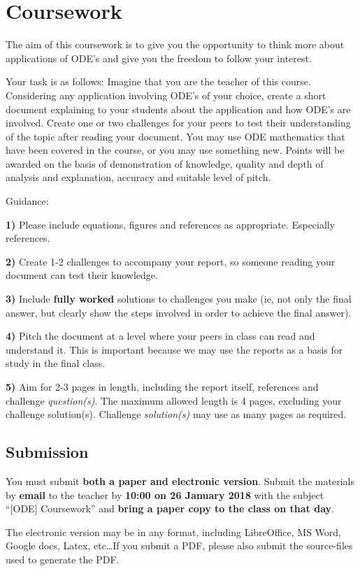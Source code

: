 \newpage
\section{Coursework}
The aim of this coursework is to give you the opportunity to think more about applications of ODE's and give you the freedom to follow your interest.

Your task is as follows:
Imagine that you are the teacher of this course.
Considering any application involving ODE's of your choice, create a short document explaining to your students about the application and how ODE's are involved.
Create one or two challenges for your peers to test their understanding of the topic after reading your document.
You may use ODE mathematics that have been covered in the course, or you may use something new.
Points will be awarded on the basis of demonstration of knowledge, quality and depth of analysis and explanation, accuracy and suitable level of pitch.

Guidance:

\textbf{1)} Please include equations, figures and references as appropriate. Especially references.

\textbf{2)} Create 1-2 challenges to accompany your report, so someone reading your document can test their knowledge.

\textbf{3)} Include \textbf{fully worked} solutions to challenges you make (ie, not only the final answer, but clearly show the steps involved in order to achieve the final answer).

\textbf{4)} Pitch the document at a level where your peers in class can read and understand it. This is important because we may use the reports as a basis for study in the final class.

\textbf{5)} Aim for 2-3 pages in length, including the report itself, references and challenge \emph{question(s)}. The maximum allowed length is 4 pages, excluding your challenge solution(s). Challenge \emph{solution(s)} may use as many pages as required.

\subsection{Submission}
You must submit \textbf{both a paper and electronic version}. Submit the materials by \textbf{email} to the teacher by \textbf{10:00 on 26 January 2018} with the subject ``[ODE] Coursework'' and \textbf{bring a paper copy to the class on that day}.

The electronic version may be in any format, including LibreOffice, MS Word, Google docs, Latex, etc\ldots If you submit a PDF, please also submit the source-files used to generate the PDF.

